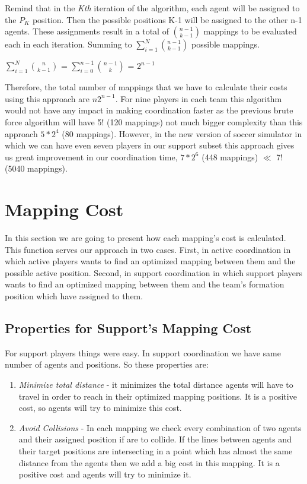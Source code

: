 Remind that in the \textit{Kth} iteration of the algorithm, each agent will be assigned to the $P_{K}$ position. Then the possible positions K-1 will be assigned to the other n-1 agents. These assignments result in a total of $ {{n-1}\choose{k-1}} $ mappings to be evaluated each in each iteration. Summing to $\sum\limits_{i=1}^N{{n-1}\choose{k-1}}$ possible mappings.\\
\begin{center}
$\sum\limits_{i=1}^N{{n}\choose{k-1}}$ = $\sum\limits_{i=0}^{n-1}{{n-1}\choose{k}}$ = $2^{n-1}$
\end{center}
Therefore, the total number of mappings that we have to calculate their costs using this approach are $n2^{n-1}$. For nine players in each team this algorithm would not have any impact in making coordination faster as the previous brute force algorithm will have 5! (120 mappings) not much bigger complexity than this approach $5 \ast 2^{4}$ (80 mappings). However, in the new version of soccer simulator in which we can have even seven players in our support subset this approach gives us great improvement in our coordination time, $7 \ast 2^{6}$ (448 mappings) $\ll$ 7! (5040 mappings).

\section{Mapping Cost}
In this section we are going to present how each mapping's cost is calculated. This function serves our approach in two cases. First, in active coordination in which active players wants to find an optimized mapping between them and the possible active position. Second, in support coordination in which support players wants to find an optimized mapping between them and the team's formation position which have assigned to them.

\subsection{Properties for Support's Mapping Cost}
For support players things were easy. In support coordination we have same number of agents and positions. So these properties are:  
\begin{enumerate}
\item \textit{Minimize total distance} - it minimizes the total distance agents will have to travel in order to reach in their optimized mapping positions. It is a positive cost, so agents will try to minimize this cost.
\item \textit{Avoid Collisions} - In each mapping we check every combination of two agents and their assigned position if are to collide. If the lines between agents and their target positions are intersecting in a point which has almost the same distance from the agents then we add a big cost in this mapping. It is a positive cost and agents will try to minimize it.
\end{enumerate}

